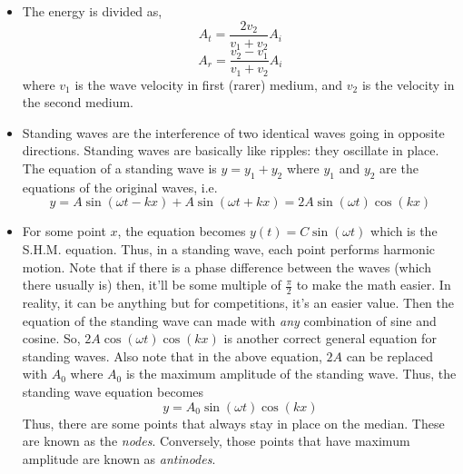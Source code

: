 \documentclass{scrartcl}
\begin{document}
    \begin{itemize}
        \item The energy is divided as, \[A_t=\frac{2v_2}{v_1+v_2}A_i\]\[A_r=\frac{v_2-v_1}{v_1+v_2}A_i\] where $v_1$ is the wave velocity in first (rarer) medium, and $v_2$ is the velocity in the second medium.
        \item Standing waves are the interference of two identical waves going in opposite directions. Standing waves are basically like ripples: they oscillate in place. The equation of a standing wave is $y=y_1+y_2$ where $y_1$ and $y_2$ are the equations of the original waves, i.e. \[y=A\sin\left(\omega t-kx\right)+A\sin\left(\omega t+kx\right)=2A\sin\left(\omega t\right)\cos\left(kx\right)\]
        \item For some point $x$, the equation becomes $y(t)=C\sin\left(\omega t\right)$ which is the S.H.M. equation. Thus, in a standing wave, each point performs harmonic motion. Note that if there is a phase difference between the waves (which there usually is) then, it'll be some multiple of $\frac{\pi}2$ to make the math easier. In reality, it can be anything but for competitions, it's an easier value. Then the equation of the standing wave can made with \textit{any} combination of sine  and cosine. So, $2A\cos\left(\omega t\right)\cos\left(kx\right)$ is another correct general equation for standing waves. Also note that in the above equation, $2A$ can be replaced with $A_0$ where $A_0$ is the maximum amplitude of the standing wave. Thus, the standing wave equation becomes \[\boxed{y=A_0\sin(\omega t)\cos(kx)}\] Thus, there are some points that always stay in place on the median. These are known as the \textit{nodes}. Conversely, those points that have maximum amplitude are known as \textit{antinodes}.

\end{itemize}
\end{document}
